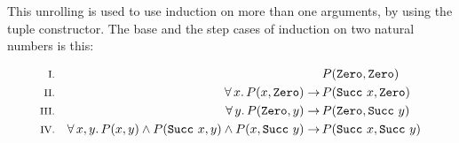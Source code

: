 \begin{comment}
Say you want to prove a property that has a list of natural numbers as
property, with up to two constructors, these are the required
induction steps:

\begin{align*}
\rom{1} &&                                                                & P(\hs{[]}) \\
\rom{2} &&                                                                & P(\hs{Zero}\hs{:}\hs{[]}) \\
\rom{3} && \fa{x} P(x\hs{:}\hs{[]}) \rightarrow                        \, & P(\hs{Succ} \w x\hs{:}\hs{[]}) \\
\rom{4} && \faaa{x}{y}{zs} P(x\hs{:}zs) \wedge P(y\hs{:}zs)\rightarrow \, & P(x\hs{:}y\hs{:}zs) \\
\end{align*}

\end{comment}


This unrolling is used to use induction on more than one arguments, by
using the tuple constructor. The base and the step cases of induction
on two natural numbers is this:

\begin{align*}
\rom{1} &&                                                                                        & P(\hs{Zero}     ,\hs{Zero}     ) \\
\rom{2} && \fa{x} P(x,\hs{Zero})                                                   \rightarrow \, & P(\hs{Succ} \w x,\hs{Zero}     ) \\
\rom{3} && \fa{y} P(\hs{Zero},y)                                                   \rightarrow \, & P(\hs{Zero}     ,\hs{Succ} \w y) \\
\rom{4} && \faa{x}{y} P(x,y) \wedge P(\hs{Succ} \w x,y) \wedge P(x,\hs{Succ} \w y) \rightarrow \, & P(\hs{Succ} \w x,\hs{Succ} \w y) \\
\end{align*}

